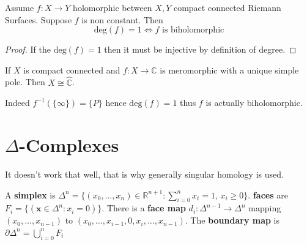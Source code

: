\begin{corollary}{}
    Assume \(f : X \to Y\) holomorphic between \(X, Y\) compact connected
    Riemann Surfaces. Suppose \(f\) is non constant. Then 
    \[
      \mathrm{deg}{(f)} = 1 \iff f \text{ is biholomorphic}
    \]
\end{corollary}
\begin{proof}{}
    If the \(\mathrm{deg}{(f)} = 1\) then it must be injective by definition of
    degree.
\end{proof}

\begin{example}{}
    If \(X\) is compact connected and \(f : X \to \mathbb{C}\) is
    meromorphic with a unique simple pole. Then \(X \cong
    \widehat{\mathbb{C}}\).

    Indeed \(f^{-1}{(\{\infty\} )} = \{P\} \) hence \(\mathrm{deg}{(f)} = 1\) thus
    \(f\) is actually biholomorphic.
\end{example}

\section{\(\Delta\)-Complexes}
It doesn't work that well, that is why generally singular homology is used.

\begin{definition}{}
    A \textbf{simplex} is \(\Delta^{n} = \{{(x_{0}, \dots, x_{n})} \in \mathbb{R}^{n+1} :
    \sum_{i=0}^{n} x_{i} = 1, \, x_{i} \ge 0 \} \). \textbf{faces} are 
    \(F_{i} = \{{(\mathbf{x}  \in \Delta^{n} : x_{i} = 0)}\} \). There is a
    \textbf{face map} \(d_{i} : \Delta^{n-1} \to \Delta^{n}\) mapping \({(x_{0},
    \dots, x_{n-1} )}\) to \({(x_{0}, \dots, x_{i-1}, 0, x_{i}, \dots, x_{n-1}
    )}\). The \textbf{boundary map} is \(\partial \Delta^{n} = \bigcup_{i=0}
    ^{n}F_{i}\) 
\end{definition}

